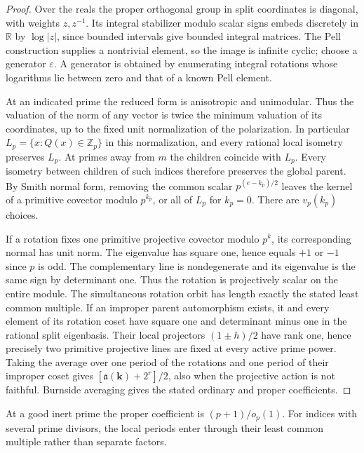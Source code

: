 \begin{proof}
Over the reals the proper orthogonal group in split coordinates is diagonal, with weights \(z,z^{-1}\). Its integral stabilizer modulo scalar signs embeds discretely in \(\mathbb R\) by \(\log|z|\), since bounded intervals give bounded integral matrices. The Pell construction supplies a nontrivial element, so the image is infinite cyclic; choose a generator \(\varepsilon\). A generator is obtained by enumerating integral rotations whose
logarithms lie between zero and that of a known Pell element.

At an indicated prime the reduced form is anisotropic and unimodular. Thus the valuation of the norm of any vector is twice the minimum valuation of its coordinates, up to the fixed unit normalization of the polarization. In particular \(L_p=\{x:Q(x)\in\mathbb Z_p\}\) in this normalization, and every rational local isometry preserves \(L_p\). At primes away from \(m\) the children coincide with \(L_p\). Every isometry between children of such indices therefore preserves the global parent. By Smith normal form, removing the common scalar \(p^{(e-k_p)/2}\) leaves the kernel of a primitive covector modulo \(p^{k_p}\), or all of \(L_p\) for \(k_p=0\). There are \(v_p(k_p)\) choices.

If a rotation fixes one primitive projective covector modulo \(p^k\), its corresponding normal has unit norm. The eigenvalue has square one, hence equals \(+1\) or \(-1\) since \(p\) is odd. The complementary line is nondegenerate and its eigenvalue is the same sign by determinant one. Thus the rotation is projectively scalar on the entire module. The simultaneous rotation orbit has length exactly the stated least common multiple. If an improper parent automorphism exists, it and every element of its rotation coset have square one and determinant minus one in the rational split eigenbasis. Their local projectors \((1\pm h)/2\) have rank one, hence precisely two primitive projective lines are fixed at every active prime power. Taking the average over one period of the rotations and one period of their improper coset gives $[\mathfrak a(\boldsymbol{k})+2^r]/2$, also when the projective action is not faithful. Burnside averaging gives the stated ordinary and proper coefficients.
\end{proof}
At a good inert prime the proper coefficient is \((p+1)/o_p(1)\).
For indices with several prime divisors, the local periods enter
through their least common multiple rather than separate factors.

